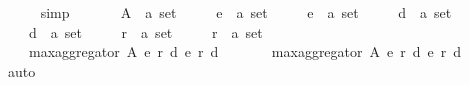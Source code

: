 \begin{isabellebody}
\ \ \ \ \isamarkupfalse%
\ simp\isanewline
{}\isamarkupfalse%
\isanewline
\ \ \isamarkupfalse%
\isanewline
\ \ \ \ A\ {\isacharcolon}{\kern0pt}{\isacharcolon}{\kern0pt}\ {\isachardoublequoteopen}{\isacharprime}{\kern0pt}a\ set{\isachardoublequoteclose}\ \isanewline
\ \ \ \ e{}\ {\isacharcolon}{\kern0pt}{\isacharcolon}{\kern0pt}\ {\isachardoublequoteopen}{\isacharprime}{\kern0pt}a\ set{\isachardoublequoteclose}\ \isanewline
\ \ \ \ e{}\ {\isacharcolon}{\kern0pt}{\isacharcolon}{\kern0pt}\ {\isachardoublequoteopen}{\isacharprime}{\kern0pt}a\ set{\isachardoublequoteclose}\ \isanewline
\ \ \ \ d{}\ {\isacharcolon}{\kern0pt}{\isacharcolon}{\kern0pt}\ {\isachardoublequoteopen}{\isacharprime}{\kern0pt}a\ set{\isachardoublequoteclose}\ \isanewline
\ \ \ \ d{}\ {\isacharcolon}{\kern0pt}{\isacharcolon}{\kern0pt}\ {\isachardoublequoteopen}{\isacharprime}{\kern0pt}a\ set{\isachardoublequoteclose}\ \isanewline
\ \ \ \ r{}\ {\isacharcolon}{\kern0pt}{\isacharcolon}{\kern0pt}\ {\isachardoublequoteopen}{\isacharprime}{\kern0pt}a\ set{\isachardoublequoteclose}\ \isanewline
\ \ \ \ r{}\ {\isacharcolon}{\kern0pt}{\isacharcolon}{\kern0pt}\ {\isachardoublequoteopen}{\isacharprime}{\kern0pt}a\ set{\isachardoublequoteclose}\isanewline
\ \ \isamarkupfalse%
\isanewline
\ \ \ \ {\isachardoublequoteopen}max{\isacharunderscore}{\kern0pt}aggregator\ A\ {\isacharparenleft}{\kern0pt}e{}{\isacharcomma}{\kern0pt}\ r{}{\isacharcomma}{\kern0pt}\ d{}{\isacharparenright}{\kern0pt}\ {\isacharparenleft}{\kern0pt}e{}{\isacharcomma}{\kern0pt}\ r{}{\isacharcomma}{\kern0pt}\ d{}{\isacharparenright}{\kern0pt}\ {\isacharequal}{\kern0pt}\isanewline
\ \ \ \ \ \ max{\isacharunderscore}{\kern0pt}aggregator\ A\ {\isacharparenleft}{\kern0pt}e{}{\isacharcomma}{\kern0pt}\ r{}{\isacharcomma}{\kern0pt}\ d{}{\isacharparenright}{\kern0pt}\ {\isacharparenleft}{\kern0pt}e{}{\isacharcomma}{\kern0pt}\ r{}{\isacharcomma}{\kern0pt}\ d{}{\isacharparenright}{\kern0pt}{\isachardoublequoteclose}\isanewline
\ \ \isamarkupfalse%
\ auto\isanewline
{}\isamarkupfalse%
%
\endisatagproof
{\isafoldproof}%
%
\isadelimproof
\isanewline
%
\endisadelimproof
%
\isadelimtheory
\isanewline
%
\endisadelimtheory
%
\isatagtheory
{}\isamarkupfalse%
%
\endisatagtheory
{\isafoldtheory}%
%
\isadelimtheory
%
\endisadelimtheory
%
\end{isabellebody}%
